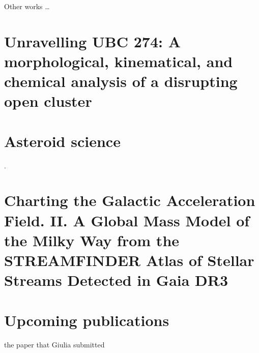 Other works \dots 
\chapter{Unravelling UBC 274: A morphological, kinematical, and chemical analysis of a disrupting open cluster}
\citet{2022A&A...664A..31C}

\chapter{Asteroid science}
\citet{2023A&A...676A...5F}. \citet{2024A&A...682A..64B}

\chapter{Charting the Galactic Acceleration Field. II. A Global Mass Model of the Milky Way from the STREAMFINDER Atlas of Stellar Streams Detected in Gaia DR3}
\citet{2024ApJ...967...89I}

\chapter{Upcoming publications}
the paper that Giulia submitted 